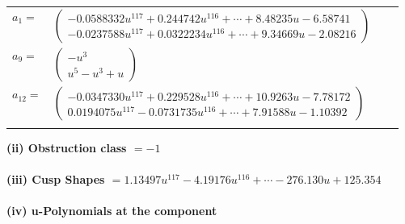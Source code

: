 \documentclass[1p]{elsarticle_modified}
\theoremstyle{definition}
\begin{document}
\begin{tabular}{m{7pt} m{180pt} m{7pt} m{180pt} }
\flushright $a_{1}=$&$\begin{pmatrix}-0.0588332 u^{117}+0.244742 u^{116}+\cdots+8.48235 u-6.58741\\-0.0237588 u^{117}+0.0322234 u^{116}+\cdots+9.34669 u-2.08216\end{pmatrix}$ \\
\flushright $a_{9}=$&$\begin{pmatrix}- u^3\\u^5- u^3+u\end{pmatrix}$ \\
\flushright $a_{12}=$&$\begin{pmatrix}-0.0347330 u^{117}+0.229528 u^{116}+\cdots+10.9263 u-7.78172\\0.0194075 u^{117}-0.0731735 u^{116}+\cdots+7.91588 u-1.10392\end{pmatrix}$\\&\end{tabular}
\flushleft \textbf{(ii) Obstruction class $= -1$}\\~\\
\flushleft \textbf{(iii) Cusp Shapes $= 1.13497 u^{117}-4.19176 u^{116}+\cdots-276.130 u+125.354$}\\~\\
\newpage\renewcommand{\arraystretch}{1}
\flushleft \textbf{(iv) u-Polynomials at the component}\newline \\
\end{document}
